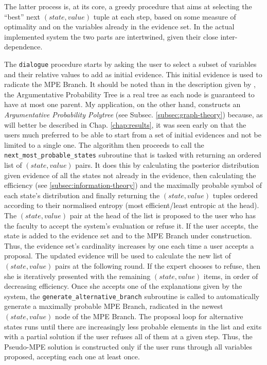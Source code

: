 The latter process is, at its core, a greedy procedure that aims at selecting the \enquote{best} next $(state, value)$ tuple at each step, based on some measure of optimality and on the variables already in the evidence set.
In the actual implemented system the two parts are intertwined, given their close inter-dependence.

The \texttt{dialogue} procedure starts by asking the user to select a subset of variables and their relative values to add as initial evidence.
This initial evidence is used to radicate the MPE Branch.
It should be noted than in the description given by \cite{Butz2018}, the Argumentative Probability Tree is a real tree as each node is guaranteed to have at most one parent.
My application, on the other hand, constructs an \textit{Argumentative Probability Polytree} (see Subsec. \ref{subsec:graph-theory}) because, as will better be described in Chap. \ref{chap:results}, it was seen early on that the users much preferred to be able to start from a set of initial evidences and not be limited to a single one.
The algorithm then proceeds to call the \texttt{next\_most\_probable\_states} subroutine that is tasked with returning an ordered list of $(state,value)$ pairs.
It does this by calculating the posterior distribution given evidence of all the states not already in the evidence, then calculating the efficiency (see \ref{subsec:information-theory}) and the maximally probable symbol of each state's distribution and finally returning the $(state,value)$ tuples ordered according to their normalised entropy (most efficient/least entropic at the head).
The $(state,value)$ pair at the head of the list is proposed to the user who has the faculty to accept the system's evaluation or refuse it.
If the user accepts, the state is added to the evidence set and to the MPE Branch under construction.
Thus, the evidence set's cardinality increases by one each time a user accepts a proposal.
The updated evidence will be used to calculate the new list of $(state,value)$ pairs at the following round.
If the expert chooses to refuse, then she is iteratively presented with the remaining $(state,value)$ items, in order of decreasing efficiency. 
Once she accepts one of the explanations given by the system, the \texttt{generate\_alternative\_branch} subroutine is called to automatically generate a maximally probable MPE Branch, radicated in the newest $(state,value)$ node of the MPE Branch.
The proposal loop for alternative states runs until there are increasingly less probable elements in the list and exits with a partial solution if the user refuses all of them at a given step.
Thus, the Pseudo-MPE solution is constructed only if the user runs through all variables proposed, accepting each one at least once.

